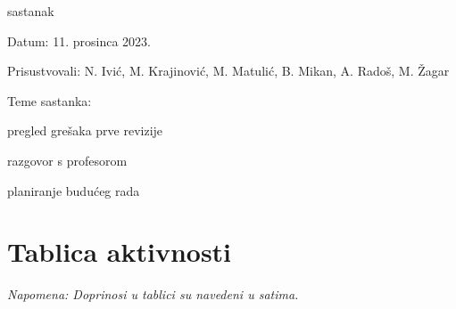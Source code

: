 \begin{packed_enum}
			\item  sastanak
			\item[] \begin{packed_item}
				\item Datum: 11. prosinca 2023.
				\item Prisustvovali: N. Ivić, M. Krajinović, M. Matulić, B. Mikan, A. Radoš, M. Žagar
				\item Teme sastanka:
				\begin{packed_item}
					\item  pregled grešaka prve revizije
					\item  razgovor s profesorom
					\item  planiranje budućeg rada
				\end{packed_item}
			\end{packed_item}
			
			
			
		\end{packed_enum}
		
		\eject
		\section*{Tablica aktivnosti}
		
			
			 \textit{Napomena: Doprinosi u tablici su navedeni u satima.}

